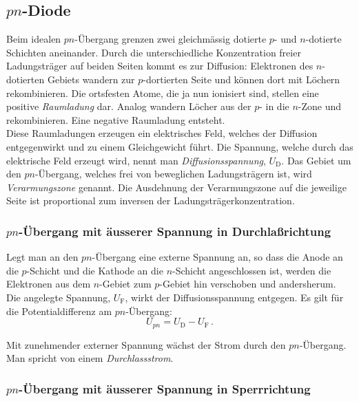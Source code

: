 \subsection{$pn$-Diode}

Beim idealen $pn$-\"Ubergang grenzen zwei gleichm\"assig dotierte $p$-
und $n$-dotierte Schichten aneinander. Durch die unterschiedliche
Konzentration freier Ladungstr\"ager auf beiden Seiten kommt es zur
Diffusion: Elektronen des $n$-dotierten Gebiets wandern zur
$p$-dortierten Seite und k\"onnen dort mit L\"ochern rekombinieren. Die 
ortsfesten Atome, die ja nun ionisiert sind, stellen eine
positive {\it Raumladung} dar. Analog wandern L\"ocher aus der
$p$- in die $n$-Zone und rekombinieren. Eine negative Raumladung
entsteht.\\
Diese Raumladungen erzeugen ein elektrisches Feld,
welches der Diffusion entgegenwirkt und zu einem Gleichgewicht
f\"uhrt. Die Spannung, welche durch das elektrische Feld erzeugt
wird, nennt man {\it Diffusionsspannung}, $U_{\mathrm{D}}$. Das Gebiet
um den $pn$-\"Ubergang, welches frei von beweglichen Ladungstr{\"a}gern
 ist, wird {\it Verarmungszone} genannt. 
Die Ausdehnung der Verarmungszone auf die
jeweilige Seite ist proportional zum inversen der
Ladungstr\"agerkonzentration.

\subsubsection{$pn$-\"Ubergang mit \"ausserer Spannung in Durchlaßrichtung}

Legt man an den $pn$-\"Ubergang eine externe Spannung an, so dass die
Anode an die $p$-Schicht und die Kathode an die $n$-Schicht
angeschlossen ist, werden die Elektronen aus dem $n$-Gebiet zum
$p$-Gebiet hin verschoben und andersherum. Die angelegte Spannung,
$U_{\mathrm{F}}$, wirkt der Diffusionsspannung entgegen. Es gilt f\"ur
die Potentialdifferenz am $pn$-\"Ubergang:
%
\begin{equation}
U_{pn} = U_{\mathrm{D}} - U_{\mathrm{F}} \, .
\end{equation}

\noindent
Mit zunehmender externer Spannung w\"achst der Strom durch den
$pn$-\"Ubergang. Man spricht von einem {\it Durchlassstrom}.

\subsubsection{$pn$-\"Ubergang mit \"ausserer Spannung in Sperrrichtung}

